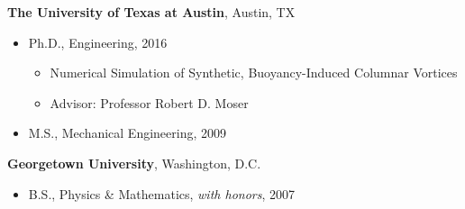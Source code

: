 %
\textbf{The University of Texas at Austin}, 
Austin, TX
\begin{itemize}

\item Ph.D., 
        Engineering, 2016
        \begin{itemize}
        \item \small{Numerical Simulation of Synthetic, 
	      Buoyancy-Induced Columnar Vortices}
        \item Advisor: Professor Robert D. Moser
        \end{itemize}

\item M.S., 
        Mechanical Engineering, 2009 

\end{itemize}

\textbf{Georgetown University}, 
Washington, D.C. 
\begin{itemize}

\item B.S., 
        Physics \& Mathematics, \emph{with honors}, 2007
\end{itemize}


